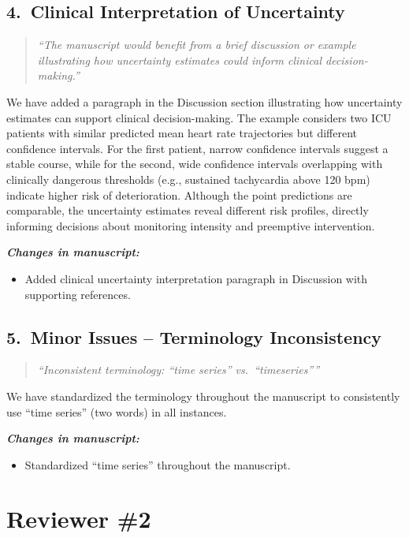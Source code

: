 \documentclass[12pt]{article}
\newcommand{\reviewercomment}[1]{%
  \begin{quote}
  \textcolor{reviewergray}{\textit{``#1''}}
  \end{quote}
}
\newcommand{\changes}{\vspace{0.3em}\noindent\textbf{\textit{Changes in manuscript:}}\vspace{0.2em}}
\begin{document}
\subsection*{4.\ Clinical Interpretation of Uncertainty}

\reviewercomment{The manuscript would benefit from a brief discussion or example illustrating how uncertainty estimates could inform clinical decision-making.}

We have added a paragraph in the Discussion section illustrating how uncertainty estimates can support clinical decision-making. The example considers two ICU patients with similar predicted mean heart rate trajectories but different confidence intervals. For the first patient, narrow confidence intervals suggest a stable course, while for the second, wide confidence intervals overlapping with clinically dangerous thresholds (e.g., sustained tachycardia above 120 bpm) indicate higher risk of deterioration. Although the point predictions are comparable, the uncertainty estimates reveal different risk profiles, directly informing decisions about monitoring intensity and preemptive intervention.

\changes
\begin{itemize}[leftmargin=2em]
\item Added clinical uncertainty interpretation paragraph in Discussion with supporting references.
\end{itemize}

\subsection*{5.\ Minor Issues -- Terminology Inconsistency}

\reviewercomment{Inconsistent terminology: ``time series'' vs.\ ``timeseries''}

We have standardized the terminology throughout the manuscript to consistently use ``time series'' (two words) in all instances.

\changes
\begin{itemize}[leftmargin=2em]
\item Standardized ``time series'' throughout the manuscript.
\end{itemize}

\newpage

\section*{Reviewer \#2}
\end{document}
